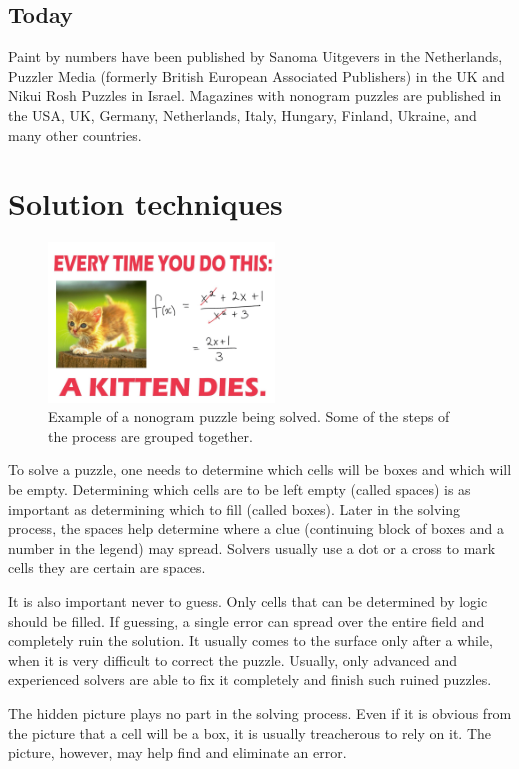 \section{Today}
Paint by numbers have been published by Sanoma Uitgevers in the Netherlands, Puzzler Media (formerly British European Associated Publishers) in the UK and Nikui Rosh Puzzles in Israel. Magazines with nonogram puzzles are published in the USA, UK, Germany, Netherlands, Italy, Hungary, Finland, Ukraine, and many other countries.


\chapter{Solution techniques}

\begin{figure}
\centering
\includegraphics[width=6cm]{picture/obr.jpg}
\caption{Example of a nonogram puzzle being solved. Some of the steps of the process are grouped together.}
\end{figure}

To solve a puzzle, one needs to determine which cells will be boxes and which will be empty. Determining which cells are to be left empty (called spaces) is as important as determining which to fill (called boxes). Later in the solving process, the spaces help determine where a clue (continuing block of boxes and a number in the legend) may spread. Solvers usually use a dot or a cross to mark cells they are certain are spaces.

It is also important never to guess. Only cells that can be determined by logic should be filled. If guessing, a single error can spread over the entire field and completely ruin the solution. It usually comes to the surface only after a while, when it is very difficult to correct the puzzle. Usually, only advanced and experienced solvers are able to fix it completely and finish such ruined puzzles.

The hidden picture plays no part in the solving process. Even if it is obvious from the picture that a cell will be a box, it is usually treacherous to rely on it. The picture, however, may help find and eliminate an error.

